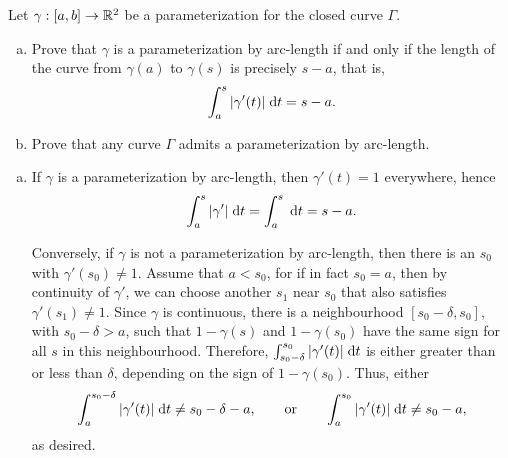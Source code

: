 \begin{exrc}[1]
    Let \(\gamma: [a, b] \to \mathbb{R}^2\) be a parameterization for the closed curve \(\Gamma\).
    \begin{enumerate}[(a)]
    \item
        Prove that \(\gamma\) is a parameterization by arc-length if and only if the length
        of the curve from \(\gamma(a)\) to \(\gamma(s)\) is precisely \(s - a\), that is,
        \begin{equation*}
            \int_{a}^{s} |\gamma'(t)| \;\mathrm d t = s - a.
        \end{equation*}

    \item
        Prove that any curve \(\Gamma\) admits a parameterization by arc-length.
    \end{enumerate}

\begin{soln}
    \begin{enumerate}[(a)]
    \item
        If \(\gamma\) is a parameterization by arc-length,
        then \(\gamma'(t) = 1\) everywhere,
        hence
        \begin{equation*}
            \int_{a}^{s} |\gamma'| \;\mathrm d t
            = \int_{a}^{s}  \;\mathrm d t
            = s - a.
        \end{equation*}

        Conversely, if \(\gamma\) is not a parameterization by arc-length,
        then there is an \(s_0\) with \(\gamma'(s_0) \neq 1\).
        Assume that \(a < s_0\),
        for if in fact \(s_0 = a\), then by continuity of \(\gamma'\),
        we can choose another \(s_1\) near \(s_0\) that also satisfies \(\gamma'(s_1) \neq 1\).
        Since \(\gamma\) is continuous, there is a neighbourhood \([s_0 - \delta, s_0]\),
        with \(s_0 - \delta > a\),
        such that \(1 - \gamma(s)\) and \(1 - \gamma(s_0)\) have the same sign
        for all \(s\) in this neighbourhood.
        Therefore, \(\int_{s_0 - \delta}^{s_0} |\gamma'(t)| \;\mathrm d t\)
        is either greater than or less than \(\delta\),
        depending on the sign of \(1 - \gamma(s_0)\).
        Thus, either
        \begin{equation*}
            \int_{a}^{s_0 - \delta} |\gamma'(t)| \;\mathrm d t \neq s_0 - \delta - a,
            \qquad \text{or} \qquad
            \int_{a}^{s_0} |\gamma'(t)| \;\mathrm d t \neq s_0 - a,
        \end{equation*}
        as desired.


\end{enumerate}
\end{soln}
\end{exrc}
